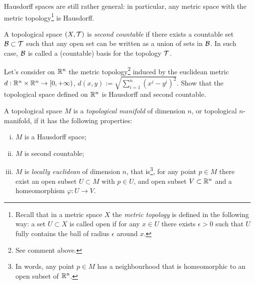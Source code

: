 Hausdorff spaces are still rather general: in particular, any metric space with the metric topology\footnote{Recall that in a metric space $X$ the \emph{metric topology} is defined in the following way: a set $U\subset X$ is called open if for any $x\in U$ there exists $\epsilon>0$ such that $U$ fully contains the ball of radius $\epsilon$ around $x$.} is Hausdorff.

\begin{definition}
	A topological space $(X, \mathcal{T})$ is \emph{second countable} if there exists a countable set $\mathcal{B}\subset\mathcal{T}$ such that any open set can be written as a union of sets in $\mathcal{B}$.
	In such case, $\mathcal{B}$ is called a (countable) basis for the topology $\mathcal{T}$.
\end{definition}

\begin{exercise}\label{exe:rntopsp}
	Let's consider on $\mathbb{R}^n$ the metric topology\footnote{See comment above.} induced by the euclidean metric $d: \mathbb{R}^n \times \mathbb{R}^n \to [0, +\infty)$, $d(x,y) := \sqrt{\sum_{i=1}^n (x^i-y^i)^2}$.
	Show that the topological space defined on $\mathbb{R}^n$ is Hausdorff and second countable.
\end{exercise}

\begin{definition}
	A topological space $M$ is a \emph{topological manifold} of dimension $n$, or topological $n$-manifold, if it has the following properties:
	\begin{enumerate}[(i)]
		\item $M$ is a Hausdorff space;
		\item $M$ is second countable;
		\item $M$ is \emph{locally euclidean} of dimension $n$, that is\footnote{In words, any point $p\in M$ has a neighbourhood that is homeomorphic to an open subset of $\mathbb{R}^n$.}, for any point $p\in M$ there exist an open subset $U\subset M$ with $p\in U$, and open subset $V\subset\mathbb{R}^n$ and a homeomorphism $\varphi: U\to V$.
	\end{enumerate}
\end{definition}

